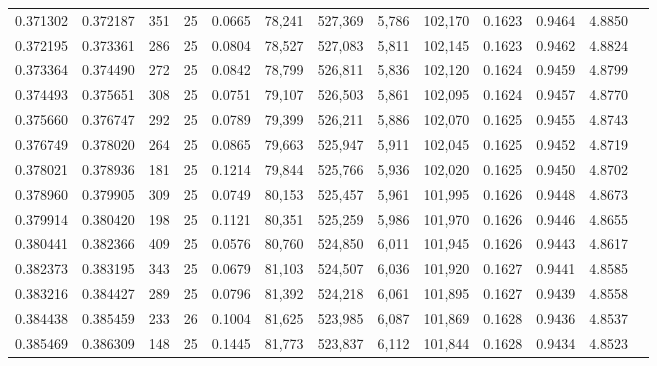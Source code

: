 \begin{tabular}{rrrrrrrrrrrrr}
0.371302 & 0.372187 &   351 &  25 &                                     0.0665 &  78,241 & 527,369 &   5,786 & 102,170 & 0.1623 & 0.9464 & 4.8850 \\
0.372195 & 0.373361 &   286 &  25 &                                     0.0804 &  78,527 & 527,083 &   5,811 & 102,145 & 0.1623 & 0.9462 & 4.8824 \\
0.373364 & 0.374490 &   272 &  25 &                                     0.0842 &  78,799 & 526,811 &   5,836 & 102,120 & 0.1624 & 0.9459 & 4.8799 \\
0.374493 & 0.375651 &   308 &  25 &                                     0.0751 &  79,107 & 526,503 &   5,861 & 102,095 & 0.1624 & 0.9457 & 4.8770 \\
0.375660 & 0.376747 &   292 &  25 &                                     0.0789 &  79,399 & 526,211 &   5,886 & 102,070 & 0.1625 & 0.9455 & 4.8743 \\
0.376749 & 0.378020 &   264 &  25 &                                     0.0865 &  79,663 & 525,947 &   5,911 & 102,045 & 0.1625 & 0.9452 & 4.8719 \\
0.378021 & 0.378936 &   181 &  25 &                                     0.1214 &  79,844 & 525,766 &   5,936 & 102,020 & 0.1625 & 0.9450 & 4.8702 \\
0.378960 & 0.379905 &   309 &  25 &                                     0.0749 &  80,153 & 525,457 &   5,961 & 101,995 & 0.1626 & 0.9448 & 4.8673 \\
0.379914 & 0.380420 &   198 &  25 &                                     0.1121 &  80,351 & 525,259 &   5,986 & 101,970 & 0.1626 & 0.9446 & 4.8655 \\
0.380441 & 0.382366 &   409 &  25 &                                     0.0576 &  80,760 & 524,850 &   6,011 & 101,945 & 0.1626 & 0.9443 & 4.8617 \\
0.382373 & 0.383195 &   343 &  25 &                                     0.0679 &  81,103 & 524,507 &   6,036 & 101,920 & 0.1627 & 0.9441 & 4.8585 \\
0.383216 & 0.384427 &   289 &  25 &                                     0.0796 &  81,392 & 524,218 &   6,061 & 101,895 & 0.1627 & 0.9439 & 4.8558 \\
0.384438 & 0.385459 &   233 &  26 &                                     0.1004 &  81,625 & 523,985 &   6,087 & 101,869 & 0.1628 & 0.9436 & 4.8537 \\
0.385469 & 0.386309 &   148 &  25 &                                     0.1445 &  81,773 & 523,837 &   6,112 & 101,844 & 0.1628 & 0.9434 & 4.8523 \\

\end{tabular}
